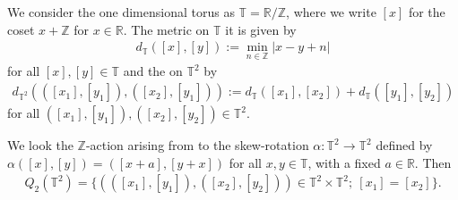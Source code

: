 \begin{example}
	We consider the one dimensional torus as $\mathbb{T} = \mathbb{R}/\mathbb{Z}$, where we write $[x]$ for the coset $x + \mathbb{Z}$ for $x \in \mathbb{R}$. The metric on $\mathbb{T}$ it is given by
	\begin{align*}
		d_\mathbb{T}([x], [y]) := \min_{n \in \mathbb{Z}} |x - y + n|
	\end{align*}
	for all $[x], [y] \in \mathbb{T}$ and the on $\mathbb{T}^2$ by
	\begin{align*}
		d_{\mathbb{T}^2}(([x_1], [y_1]), ([x_2], [y_1])) := d_\mathbb{T}([x_1], [x_2]) + d_\mathbb{T}([y_1], [y_2])
	\end{align*}
	for all $([x_1], [y_1]), ([x_2], [y_2]) \in \mathbb{T}^2$.
	
	We look the $\mathbb{Z}$-action arising from to the skew-rotation $\alpha: \mathbb{T}^2 \to \mathbb{T}^2$ defined by $\alpha([x], [y]) = ([x + a], [y + x])$ for all $x, y \in \mathbb{T}$, with a fixed $a \in \mathbb{R}$. Then
	\begin{align*}
		Q_2(\mathbb{T}^2) = \{(([x_1], [y_1]), ([x_2], [y_2])) \in \mathbb{T}^2 \times \mathbb{T}^2;\ [x_1]=[x_2]\}.
	\end{align*}
\end{example}
